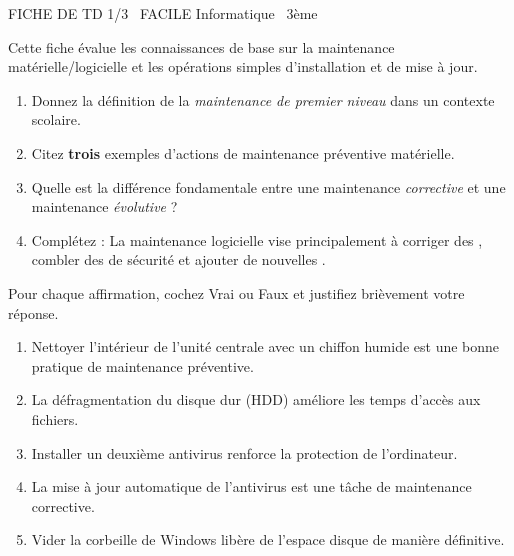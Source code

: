 \documentclass[11pt]{article}
\begin{document}
\begin{tcolorbox}[enhanced,colback=popink,colframe=popink,arc=10pt,boxrule=0pt,left=12pt,right=12pt,top=9pt,bottom=9pt]
{\color{white}\popxbold\small FICHE DE TD 1/3 \textbullet\ FACILE \hfill Informatique \textbullet\ 3ème\par}
\end{tcolorbox}
\vspace{4pt}
Cette fiche évalue les connaissances de base sur la maintenance matérielle/logicielle et les opérations simples d'installation et de mise à jour.

\begin{exercice}
\begin{enumerate}
    \item Donnez la définition de la \textit{maintenance de premier niveau} dans un contexte scolaire.
    \item Citez \textbf{trois} exemples d'actions de maintenance préventive matérielle.
    \item Quelle est la différence fondamentale entre une maintenance \textit{corrective} et une maintenance \textit{évolutive} ?
    \item Complétez : La maintenance logicielle vise principalement à corriger des \underline{\hspace{3cm}}, combler des \underline{\hspace{3cm}} de sécurité et ajouter de nouvelles \underline{\hspace{3cm}}.
\end{enumerate}
\end{exercice}

\begin{exercice}
Pour chaque affirmation, cochez Vrai ou Faux et justifiez brièvement votre réponse.
\begin{enumerate}
    \item Nettoyer l'intérieur de l'unité centrale avec un chiffon humide est une bonne pratique de maintenance préventive.
    \item La défragmentation du disque dur (HDD) améliore les temps d'accès aux fichiers.
    \item Installer un deuxième antivirus renforce la protection de l'ordinateur.
    \item La mise à jour automatique de l'antivirus est une tâche de maintenance corrective.
    \item Vider la corbeille de Windows libère de l'espace disque de manière définitive.
\end{enumerate}
\end{exercice}
\end{document}
